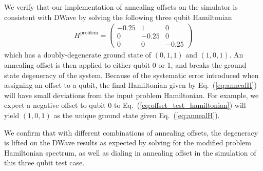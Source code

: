 \documentclass[prd,twocolumn,tightenlines,preprintnumbers,showpacs,superscriptaddress,notitlepage,nofootinbib,eqsecnum,floatfix,longbibliography,aps,10pt]{revtex4-2}
\begin{document}
We verify that our implementation of annealing offsets on the simulator is consistent with DWave by solving the following three qubit Hamiltonian
\begin{align}
	\label{eq:offset_test_hamiltonian}
	H^{\textrm{problem}} =
	\begin{pmatrix}
		-0.25 & 1 & 0 \\
		0 & -0.25 & 0 \\
		0 & 0 & -0.25
	\end{pmatrix}
\end{align}
which has a doubly-degenerate ground state of $(0, 1, 1)$ and $(1, 0, 1)$. An annealing offset is then applied to either qubit 0 or 1, and breaks the ground state degeneracy of the system. Because of the systematic error introduced when assigning an offset to a qubit, the final Hamiltonian given by Eq.~(\ref{eq:annealH}) will have small deviations from the input problem Hamiltonian. For example, we expect a negative offset to qubit 0 to Eq.~(\ref{eq:offset_test_hamiltonian}) will yield $(1, 0, 1)$ as the unique ground state given Eq.~(\ref{eq:annealH}).

We confirm that with different combinations of annealing offsets, the degeneracy is lifted on the DWave results as expected by solving for the modified problem Hamiltonian spectrum, as well as dialing in annealing offset in the simulation of this three qubit test case.
\end{document}
